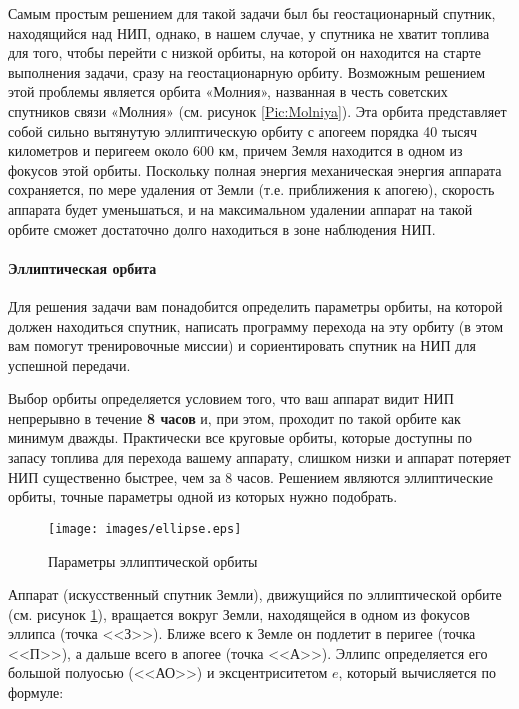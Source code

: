 \documentclass[12pt,a4paper]{article}
\begin{document}
Самым простым решением для такой задачи был бы геостационарный спутник, находящийся над
НИП, однако, в нашем случае, у спутника не хватит топлива для того, чтобы перейти с низкой
орбиты, на которой он находится на старте выполнения задачи, сразу на геостационарную
орбиту. Возможным решением этой проблемы является орбита «Молния», названная в честь
советских спутников связи «Молния» (см. рисунок \ref{Pic:Molniya}). Эта орбита
представляет собой сильно вытянутую эллиптическую орбиту с апогеем порядка 40 тысяч
километров и перигеем около 600 км, причем Земля находится в одном из фокусов этой
орбиты. Поскольку полная энергия механическая энергия аппарата сохраняется, по мере
удаления от Земли (т.е. приближения к апогею), скорость аппарата будет уменьшаться, и на
максимальном удалении аппарат на такой орбите сможет достаточно долго находиться в зоне
наблюдения НИП.

\paragraph{Эллиптическая орбита}

Для решения задачи вам понадобится определить параметры орбиты, на которой должен
находиться спутник, написать программу перехода на эту орбиту (в этом вам помогут
тренировочные миссии) и сориентировать спутник на НИП для успешной передачи.

Выбор орбиты определяется условием того, что ваш аппарат видит НИП непрерывно в течение \textbf{8
часов} и, при этом, проходит по такой орбите как минимум дважды. Практически все круговые
орбиты, которые доступны по запасу топлива для перехода вашему аппарату, слишком низки и
аппарат потеряет НИП существенно быстрее, чем за 8 часов. Решением являются эллиптические
орбиты, точные параметры одной из которых нужно подобрать.

\begin{figure}[tbh]
  \begin{center}
    \texttt{[image: images/ellipse.eps]}
    \caption{Параметры эллиптической орбиты}
    \label{Pic:Ellipse}
  \end{center}
\end{figure}

Аппарат (искусственный спутник Земли), движущийся по эллиптической орбите (см. рисунок \ref{Pic:Ellipse}), вращается
вокруг Земли, находящейся в одном из фокусов эллипса (точка <<З>>). Ближе всего к Земле он
подлетит в перигее (точка <<П>>), а дальше всего в апогее (точка <<А>>). Эллипс определяется его
большой полуосью (<<АО>>) и эксцентриситетом $e$, который вычисляется по формуле:
\end{document}
